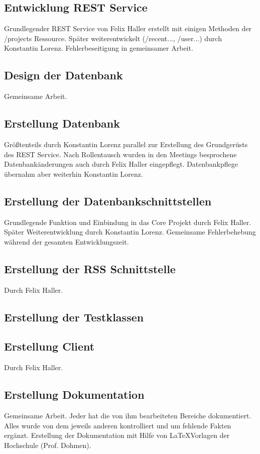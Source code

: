 \documentclass[12pt]{scrartcl}
\begin{document}
		\subsection{Entwicklung REST Service}
			Grundlegender REST Service von Felix Haller erstellt mit einigen Methoden der /projects Ressource. Später weiterentwickelt (/recent..., /user...) durch Konstantin Lorenz. Fehlerbeseitigung in gemeinsamer Arbeit. 
		\subsection{Design der Datenbank}
			Gemeinsame Arbeit.
		\subsection{Erstellung Datenbank}
			Größtenteils durch Konstantin Lorenz parallel zur Erstellung des Grundgerüsts des REST Service. Nach Rollentausch wurden in den Meetings besprochene Datenbankänderungen auch durch Felix Haller eingepflegt. Datenbankpflege übernahm aber weiterhin Konstantin Lorenz.
		\subsection{Erstellung der Datenbankschnittstellen}
			Grundlegende Funktion und Einbindung in das Core Projekt durch Felix Haller. Später Weiterentwicklung durch Konstantin Lorenz. Gemeinsame Fehlerbehebung während der gesamten Entwicklungszeit.
		\subsection{Erstellung der RSS Schnittstelle}
			Durch Felix Haller.
		\subsection{Erstellung der Testklassen}
			
		\subsection{Erstellung Client}
			Durch Felix Haller.
		\subsection{Erstellung Dokumentation}
			Gemeinsame Arbeit. Jeder hat die von ihm bearbeiteten Bereiche dokumentiert. Alles wurde von dem jeweils anderen kontrolliert und um fehlende Fakten ergänzt. Erstellung der Dokumentation mit Hilfe von \LaTeX Vorlagen der Hochschule (Prof. Dohmen).
	
\end{document}
